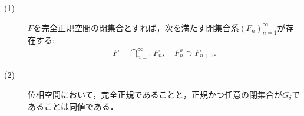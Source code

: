 	\begin{screen}
		\begin{thm}
		\label{thm:perfectly_normal_Hausdorff_is_normal_and_closed_is_G_delta}\mbox{}
			\begin{description}
				\item[(1)]
					$F$を完全正規空間の閉集合とすれば，次を満たす閉集合系$(F_n)_{n=1}^\infty$が存在する:
					\begin{align}
						F = \bigcap_{n=1}^\infty F_n,
						\quad F_n^{\mathrm{o}} \supset F_{n+1}. 
					\end{align}
					
				\item[(2)]
					位相空間において，完全正規であることと，正規かつ任意の閉集合が$G_\delta$であることは同値である．
			\end{description}
		\end{thm}
	\end{screen}
	
